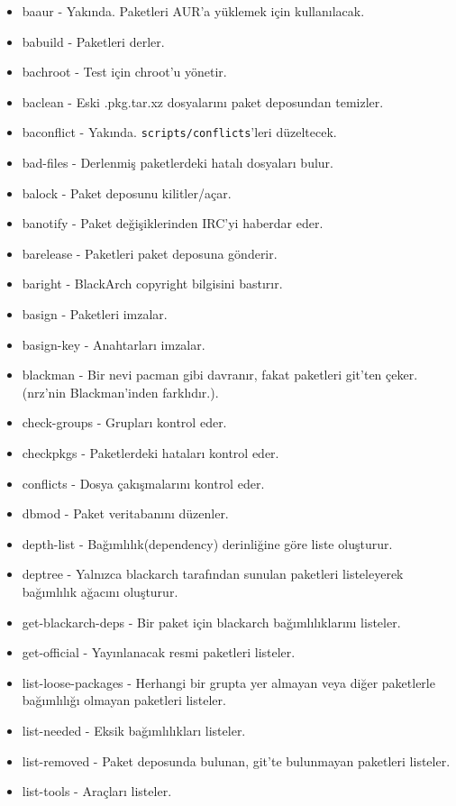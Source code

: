 \documentclass[a4paper, oneside, 11pt]{book}
\begin{document}
\begin{itemize}
\item baaur - Yakında. Paketleri AUR'a yüklemek için kullanılacak.
\item babuild - Paketleri derler.
\item bachroot - Test için chroot'u yönetir.
\item baclean - Eski .pkg.tar.xz dosyalarını paket deposundan temizler.
\item baconflict - Yakında. \verb|scripts/conflicts|'leri düzeltecek.
\item bad-files - Derlenmiş paketlerdeki hatalı dosyaları bulur.
\item balock - Paket deposunu kilitler/açar.
\item banotify - Paket değişiklerinden IRC'yi haberdar eder.
\item barelease - Paketleri paket deposuna gönderir.
\item baright - BlackArch copyright bilgisini bastırır.
\item basign - Paketleri imzalar.
\item basign-key - Anahtarları imzalar.
\item blackman - Bir nevi pacman gibi davranır, fakat paketleri git'ten çeker.
(nrz'nin Blackman'inden farklıdır.).
\item check-groups - Grupları kontrol eder.
\item checkpkgs - Paketlerdeki hataları kontrol eder.
\item conflicts - Dosya çakışmalarını kontrol eder.
\item dbmod - Paket veritabanını düzenler.
\item depth-list - Bağımlılık(dependency) derinliğine göre liste oluşturur.
\item deptree - Yalnızca blackarch tarafından sunulan paketleri listeleyerek
    bağımlılık ağacını oluşturur.
\item get-blackarch-deps - Bir paket için blackarch bağımlılıklarını listeler.
\item get-official - Yayınlanacak resmi paketleri listeler.
\item list-loose-packages - Herhangi bir grupta yer almayan veya diğer paketlerle
    bağımlılığı olmayan paketleri listeler.
\item list-needed - Eksik bağımlılıkları listeler.
\item list-removed - Paket deposunda bulunan, git'te bulunmayan paketleri listeler.
\item list-tools - Araçları listeler.

\end{itemize}
\end{document}
